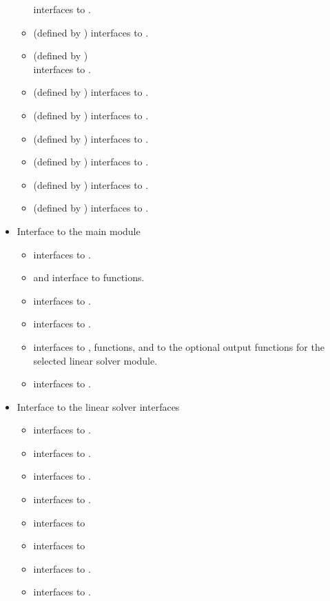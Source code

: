 \begin{itemize}
\begin{itemize}
    interfaces to .
  \item {} (defined by {\sunlinsollapband}) 
    interfaces to .
  \item {} (defined by {\sunlinsollapdense}) \\
    interfaces to .
  \item {} (defined by {\sunlinsolpcg}) 
    interfaces to .
  \item {} (defined by {\sunlinsolspbcgs}) 
    interfaces to .
  \item {} (defined by {\sunlinsolspfgmr}) 
    interfaces to .
  \item {} (defined by {\sunlinsolspgmr}) 
    interfaces to .
  \item {} (defined by {\sunlinsolsptfqmr}) 
    interfaces to .
  \item {} (defined by {\sunlinsolslumt}) 
    interfaces to .
  \end{itemize}
\item Interface to the main {\kinsol} module
  \begin{itemize}
  \item {}
    interfaces to .
  \item {} and 
    interface to  functions.
  \item {}
    interfaces to .
  \item {}
    interfaces to .
  \item {}
    interfaces to ,  functions, and to the optional
    output functions for the selected linear solver module.
  \item {}    
    interfaces to .
  \end{itemize}  
\item Interface to the linear solver interfaces
  \begin{itemize}
  \item {}    
    interfaces to .
  \item {}
    interfaces to .
  \item {}
    interfaces to .
  \item {}
    interfaces to .
  \item {}
    interfaces to 
  \item {}
    interfaces to 
  \item {}
   interfaces to .
  \item {}
    interfaces to .
 \end{itemize}

\end{itemize}
